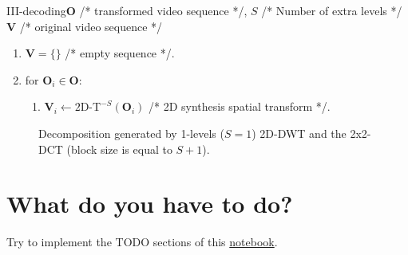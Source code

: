 \begin{myalg}{III-decoding}{$\mathbf{O}$ /* transformed video sequence */, $S$ /* Number of extra levels */}{$\mathbf{V}$ /* original video sequence */}
  \label{alg:III_decoding}
  \begin{enumerate}
  \item ${\mathbf V}=\{\}$ /* empty sequence */.
  \item for ${\mathbf O}_i\in {\mathbf O}$:
    \begin{enumerate}
    \item ${\mathbf V}_i\leftarrow\text{2D-T}^{-S}({\mathbf O}_i)$ /* 2D synthesis spatial transform */.
    \end{enumerate}
  \end{enumerate}
\end{myalg}

\begin{figure}
  \centering
  \caption{Decomposition generated by 1-levels ($S=1$) 2D-DWT and the 2x2-DCT (block size is equal to $S+1$).}
  \label{fig:III}
\end{figure}


\section{What do you have to do?}

Try to implement the TODO sections of this \href{https://github.com/Sistemas-Multimedia/Sistemas-Multimedia.github.io/blob/master/milestones/09-III_coding/III_compression.ipynb}{notebook}.

